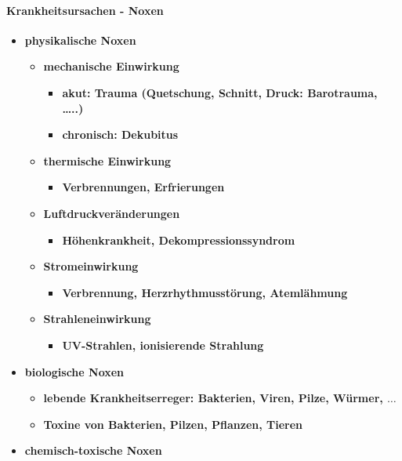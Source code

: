 \paragraph{Krankheitsursachen - Noxen}
	\begin{itemize}
		\item \textbf{physikalische Noxen}
			\begin{itemize}
				\item \textbf{mechanische Einwirkung}
					\begin{itemize}
						\item \textbf{akut: Trauma (Quetschung, Schnitt, Druck: Barotrauma, …..)}
						\item \textbf{chronisch: Dekubitus}
					\end{itemize}
				\item \textbf{thermische Einwirkung}
					\begin{itemize}
						\item \textbf{Verbrennungen, Erfrierungen}
					\end{itemize}
				\item \textbf{Luftdruckveränderungen}
					\begin{itemize}
						\item \textbf{Höhenkrankheit, Dekompressionssyndrom}
					\end{itemize}
				\item \textbf{Stromeinwirkung}
					\begin{itemize}
						\item \textbf{Verbrennung, Herzrhythmusstörung, Atemlähmung}
					\end{itemize}
				\item \textbf{Strahleneinwirkung}
					\begin{itemize}
						\item \textbf{UV-Strahlen, ionisierende Strahlung}
					\end{itemize}
			\end{itemize}
		\item \textbf{biologische Noxen}
			\begin{itemize}
				\item \textbf{lebende Krankheitserreger: Bakterien, Viren, Pilze, Würmer, $\dots$}
				\item \textbf{Toxine von Bakterien, Pilzen, Pflanzen, Tieren}
			\end{itemize}
		\item \textbf{chemisch-toxische Noxen}
			\begin{itemize}

\end{itemize}
\end{itemize}
